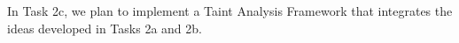 %
%

In Task 2c, we plan to implement a Taint Analysis Framework that integrates the ideas developed in Tasks 2a and 2b.
%
%

%


